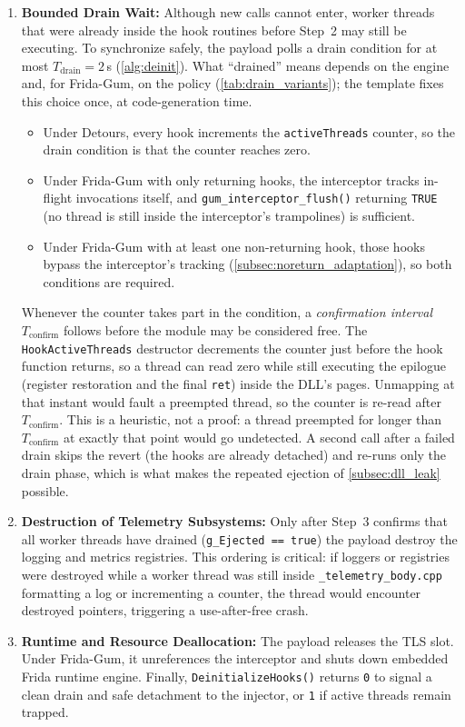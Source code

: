 \begin{enumerate}
	\item \textbf{Bounded Drain Wait:}
	Although new calls cannot enter, worker threads that were already inside the hook routines before Step~2 may still be executing.
	To synchronize safely, the payload polls a drain condition for at most $T_{\mathrm{drain}}=2$\,s (\cref{alg:deinit}).
	What ``drained'' means depends on the engine and, for Frida-Gum, on the policy (\cref{tab:drain_variants}); the template fixes this choice once, at code-generation time.
	\begin{itemize}
		\item Under Detours, every hook increments the \texttt{activeThreads} counter, so the drain condition is that the counter reaches zero.
		\item Under Frida-Gum with only returning hooks, the interceptor tracks in-flight invocations itself, and \texttt{gum\_interceptor\_flush()} returning \texttt{TRUE} (no thread is still inside the interceptor's trampolines) is sufficient.
		\item Under Frida-Gum with at least one non-returning hook, those hooks bypass the interceptor's tracking (\cref{subsec:noreturn_adaptation}), so both conditions are required.
	\end{itemize}
	Whenever the counter takes part in the condition, a \emph{confirmation interval} $T_{\mathrm{confirm}}$ follows before the module may be considered free.
	The \texttt{HookActiveThreads} destructor decrements the counter just before the hook function returns, so a thread can read zero while still executing the epilogue (register restoration and the final \texttt{ret}) inside the \ac{DLL}'s pages.
	Unmapping at that instant would fault a preempted thread, so the counter is re-read after $T_{\mathrm{confirm}}$.
	This is a heuristic, not a proof: a thread preempted for longer than $T_{\mathrm{confirm}}$ at exactly that point would go undetected.
	A second call after a failed drain skips the revert (the hooks are already detached) and re-runs only the drain phase, which is what makes the repeated ejection of \cref{subsec:dll_leak} possible.

	\item \textbf{Destruction of Telemetry Subsystems:}
	Only after Step~3 confirms that all worker threads have drained (\texttt{g\_Ejected == true}) the payload destroy the logging and metrics registries.
	This ordering is critical: if loggers or registries were destroyed while a worker thread was still inside \texttt{\_telemetry\_body.cpp} formatting a log or incrementing a counter, the thread would encounter destroyed pointers, triggering a use-after-free crash.

	\item \textbf{Runtime and Resource Deallocation:}
	The payload releases the TLS slot.
	Under Frida-Gum, it unreferences the interceptor and shuts down embedded Frida runtime engine.
	Finally, \texttt{DeinitializeHooks()} returns \texttt{0} to signal a clean drain and safe detachment to the injector, or \texttt{1} if active threads remain trapped.
\end{enumerate}

